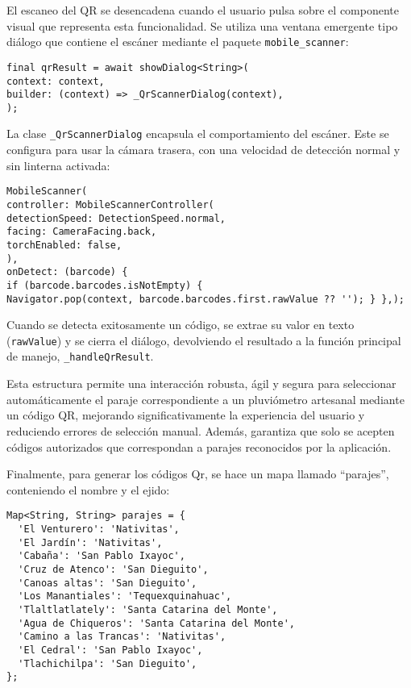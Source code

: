 El escaneo del QR se desencadena cuando el usuario pulsa sobre el componente visual que representa esta funcionalidad. Se utiliza una ventana emergente tipo diálogo que contiene el escáner mediante el paquete \texttt{mobile\_scanner}:

\begin{verbatim}
final qrResult = await showDialog<String>(
context: context,
builder: (context) => _QrScannerDialog(context),
);
\end{verbatim}

La clase \texttt{\_QrScannerDialog} encapsula el comportamiento del escáner. Este se configura para usar la cámara trasera, con una velocidad de detección normal y sin linterna activada:

\begin{verbatim}
MobileScanner(
controller: MobileScannerController(
detectionSpeed: DetectionSpeed.normal,
facing: CameraFacing.back,
torchEnabled: false,
),
onDetect: (barcode) {
if (barcode.barcodes.isNotEmpty) {
Navigator.pop(context, barcode.barcodes.first.rawValue ?? ''); } },);
\end{verbatim}

Cuando se detecta exitosamente un código, se extrae su valor en texto (\texttt{rawValue}) y se cierra el diálogo, devolviendo el resultado a la función principal de manejo, \texttt{\_handleQrResult}.

Esta estructura permite una interacción robusta, ágil y segura para seleccionar automáticamente el paraje correspondiente a un pluviómetro artesanal mediante un código QR, mejorando significativamente la experiencia del usuario y reduciendo errores de selección manual. Además, garantiza que solo se acepten códigos autorizados que correspondan a parajes reconocidos por la aplicación.

Finalmente, para generar los códigos Qr, se hace un mapa llamado ``parajes'', conteniendo el nombre y el ejido:

\begin{verbatim}
Map<String, String> parajes = {
  'El Venturero': 'Nativitas',
  'El Jardín': 'Nativitas',
  'Cabaña': 'San Pablo Ixayoc',
  'Cruz de Atenco': 'San Dieguito',
  'Canoas altas': 'San Dieguito',
  'Los Manantiales': 'Tequexquinahuac',
  'Tlaltlatlately': 'Santa Catarina del Monte',
  'Agua de Chiqueros': 'Santa Catarina del Monte',
  'Camino a las Trancas': 'Nativitas',
  'El Cedral': 'San Pablo Ixayoc',
  'Tlachichilpa': 'San Dieguito',
};
\end{verbatim}

